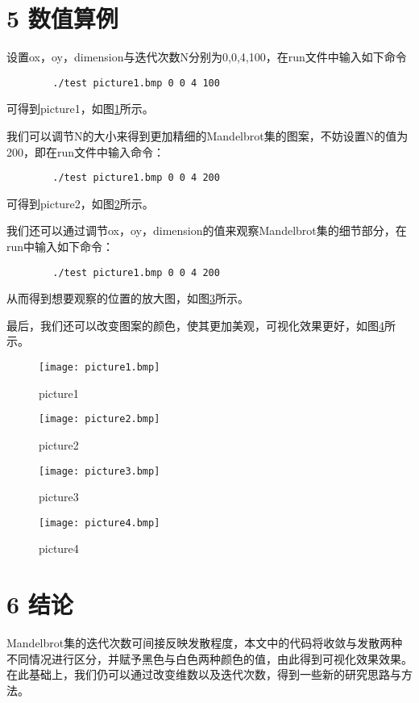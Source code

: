 \documentclass[twocolumn]{ctexart}
\begin{document}
	\section*{5 数值算例}
	设置ox，oy，dimension与迭代次数N分别为0,0,4,100，在run文件中输入如下命令
	\begin{verbatim}
		./test picture1.bmp 0 0 4 100
	\end{verbatim}
	可得到picture1，如图\ref{fig:1}所示。
	
	我们可以调节N的大小来得到更加精细的Mandelbrot集的图案，不妨设置N的值为200，即在run文件中输入命令：
	\begin{verbatim}
		./test picture1.bmp 0 0 4 200
	\end{verbatim}
	可得到picture2，如图\ref{fig:2}所示。
	
	我们还可以通过调节ox，oy，dimension的值来观察Mandelbrot集的细节部分，在run中输入如下命令：
	\begin{verbatim}
		./test picture1.bmp 0 0 4 200
	\end{verbatim}
	从而得到想要观察的位置的放大图，如图\ref{fig:3}所示。
	
	最后，我们还可以改变图案的颜色，使其更加美观，可视化效果更好，如图\ref{fig:4}所示。
    \begin{figure}[htbp]
      	\texttt{[image: picture1.bmp]}
      	      	\caption{picture1}
      	\label{fig:1}
    \end{figure}
 	\begin{figure}[htbp]
 		\texttt{[image: picture2.bmp]}
 		\caption{picture2}
 		\label{fig:2}
 	\end{figure}
 	\begin{figure}[htbp]
 		\texttt{[image: picture3.bmp]}
 		\caption{picture3}
 		\label{fig:3}
 	\end{figure}
 	\begin{figure}[htbp]
 		\texttt{[image: picture4.bmp]}
 		\caption{picture4}
 		\label{fig:4}
 	\end{figure}
 
	\section*{6 结论}
	Mandelbrot集的迭代次数可间接反映发散程度，本文中的代码将收敛与发散两种不同情况进行区分，并赋予黑色与白色两种颜色的值，由此得到可视化效果效果。在此基础上，我们仍可以通过改变维数以及迭代次数，得到一些新的研究思路与方法。
	
	
	
\end{document}
